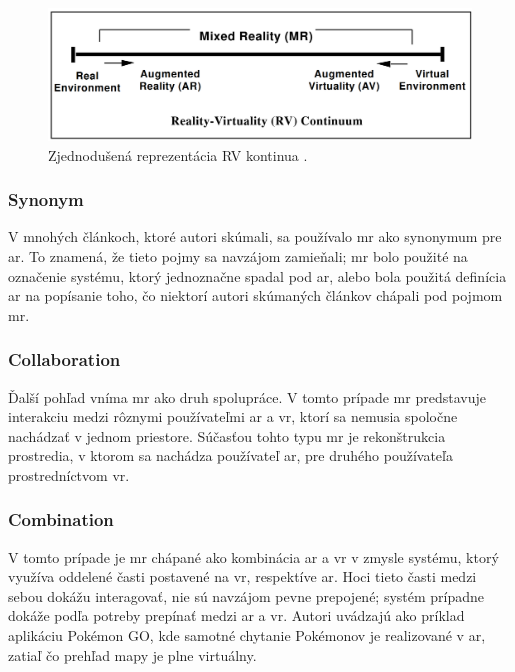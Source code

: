 \begin{figure}[!htbp]
  \centering
  \includegraphics[width=12cm]{img/continuum.png}
  \caption{Zjednodušená reprezentácia RV kontinua \cite{milgramAugmentedRealityClass1995}.}
  \label{rv-continuum}
\end{figure}	

\subsubsection{Synonym}
V mnohých článkoch, ktoré autori \cite{speicherWhatMixedReality2019a} skúmali, sa používalo \acrshort{mr} ako synonymum pre \acrshort{ar}. To znamená, že tieto pojmy sa 
navzájom zamieňali; \acrshort{mr} bolo použité na označenie systému, ktorý jednoznačne spadal pod \acrshort{ar}, alebo bola použitá definícia \acrshort{ar} na popísanie toho,
čo niektorí autori skúmaných článkov chápali pod pojmom \acrshort{mr}.

\subsubsection{Collaboration}
Ďalší pohľad vníma \acrshort{mr} ako druh spolupráce. V tomto prípade \acrshort{mr} predstavuje interakciu medzi rôznymi používateľmi \acrshort{ar} a \acrshort{vr}, ktorí
sa nemusia spoločne nachádzať v jednom priestore. Súčasťou tohto typu \acrshort{mr} je rekonštrukcia prostredia, v ktorom sa nachádza používateľ \acrshort{ar}, pre druhého
používateľa prostredníctvom \acrshort{vr}.

\subsubsection{Combination}
V tomto prípade je \acrshort{mr} chápané ako kombinácia \acrshort{ar} a \acrshort{vr} v zmysle systému, ktorý využíva oddelené časti postavené na \acrshort{vr}, respektíve
\acrshort{ar}. Hoci tieto časti medzi sebou dokážu interagovať, nie sú navzájom pevne prepojené; systém prípadne dokáže podľa potreby prepínať medzi \acrshort{ar} a
\acrshort{vr}. Autori \cite{speicherWhatMixedReality2019a} uvádzajú ako príklad aplikáciu Pokémon GO, kde samotné chytanie Pokémonov je realizované v \acrshort{ar}, zatiaľ čo 
prehľad mapy je plne virtuálny.

